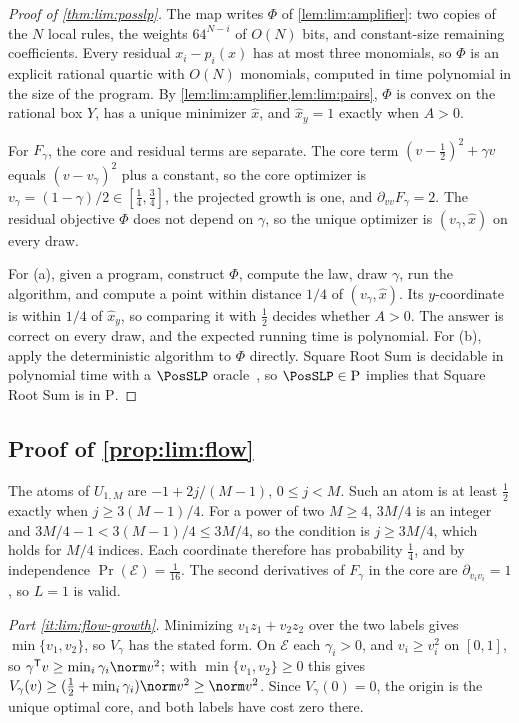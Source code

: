 \begin{proof}[Proof of \cref{thm:lim:posslp}]
The map writes $\Phi$ of \cref{lem:lim:amplifier}: two copies of the
$N$ local rules, the weights $64^{N-i}$ of $O(N)$ bits, and constant-size
remaining coefficients. Every residual $x_i-p_i(x)$ has at most three
monomials, so $\Phi$ is an explicit rational quartic with $O(N)$ monomials,
computed in time polynomial in the size of the program. By
\cref{lem:lim:amplifier,lem:lim:pairs}, $\Phi$ is convex on the rational box
$Y$, has a unique minimizer $\hat x$, and $\hat x_y=1$ exactly when $A>0$.

For $F_\gamma$, the core and residual terms are separate. The core term
$(v-\frac12)^2+\gamma v$ equals $(v-v_\gamma)^2$ plus a constant, so the
core optimizer is $v_\gamma=(1-\gamma)/2\in[\frac14,\frac34]$, the projected
growth is one, and $\partial_{vv}F_\gamma=2$. The residual objective $\Phi$
does not depend on $\gamma$, so the unique optimizer is
$(v_\gamma,\hat x)$ on every draw.

For (a), given a program, construct $\Phi$, compute the law, draw $\gamma$,
run the algorithm, and compute a point within distance $1/4$ of
$(v_\gamma,\hat x)$. Its $y$-coordinate is within $1/4$ of $\hat x_y$, so
comparing it with $\frac12$ decides whether $A>0$. The answer is correct on
every draw, and the expected running time is polynomial. For (b), apply the
deterministic algorithm to $\Phi$ directly. Square Root Sum is decidable in
polynomial time with a $\PosSLP$ oracle~\citep{allender2009-on-the-complexity-of-numerical}, so
$\PosSLP\in\mathrm P$ implies that Square Root Sum is in $\mathrm P$.
\end{proof}

\subsection{Proof of \texorpdfstring{\cref{prop:lim:flow}}{the flow-boundary proposition}}\label{app:lim:flow}

The atoms of $U_{1,M}$ are $-1+2j/(M-1)$, $0\le j<M$. Such an atom is at
least $\frac12$ exactly when $j\ge3(M-1)/4$. For a power of two $M\ge4$,
$3M/4$ is an integer and $3M/4-1<3(M-1)/4\le3M/4$, so the condition is
$j\ge3M/4$, which holds for $M/4$ indices. Each coordinate therefore has
probability $\frac14$, and by independence $\Pr(\mathcal E)=\frac1{16}$. The
second derivatives of $F_\gamma$ in the core are $\partial_{v_iv_i}=1$, so
$L=1$ is valid.

\emph{Part \ref{it:lim:flow-growth}.} Minimizing $v_1z_1+v_2z_2$ over the
two labels gives $\min\{v_1,v_2\}$, so $V_\gamma$ has the stated form. On
$\mathcal E$ each $\gamma_i>0$, and $v_i\ge v_i^2$ on $[0,1]$, so
$\gamma^{\mathsf T}v\ge\min_i\gamma_i\norm v^2$; with $\min\{v_1,v_2\}\ge0$
this gives $V_\gamma(v)\ge(\frac12+\min_i\gamma_i)\norm v^2\ge\norm v^2$.
Since $V_\gamma(0)=0$, the origin is the unique optimal core, and both
labels have cost zero there.

